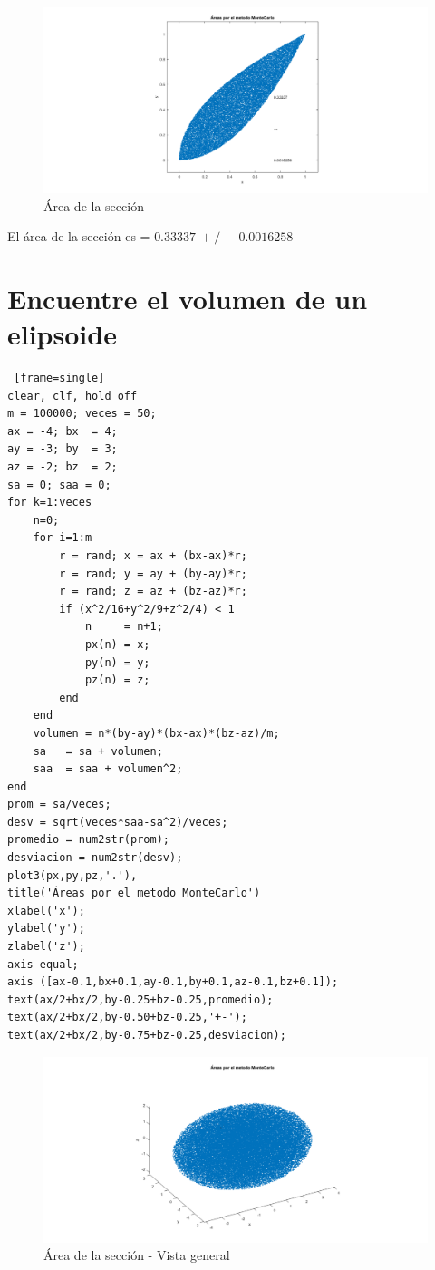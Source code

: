 \documentclass{article}
\begin{document}
\begin{figure}[H]
\centering
    \includegraphics[width=1\textwidth]{images/FIG04.png}
    \caption{Área de la sección}
\end{figure}
El área de la sección es = $0.33337~+/-~0.0016258$

\section{Encuentre el volumen de un elipsoide}

\begin{lstlisting} [frame=single]
clear, clf, hold off
m = 100000; veces = 50;
ax = -4; bx  = 4;
ay = -3; by  = 3;
az = -2; bz  = 2; 
sa = 0; saa = 0;
for k=1:veces
    n=0;
    for i=1:m
        r = rand; x = ax + (bx-ax)*r;
        r = rand; y = ay + (by-ay)*r;
        r = rand; z = az + (bz-az)*r;
        if (x^2/16+y^2/9+z^2/4) < 1
            n     = n+1;
            px(n) = x; 
            py(n) = y;
            pz(n) = z;
        end
    end
    volumen = n*(by-ay)*(bx-ax)*(bz-az)/m;
    sa   = sa + volumen;
    saa  = saa + volumen^2;
end
prom = sa/veces;
desv = sqrt(veces*saa-sa^2)/veces;
promedio = num2str(prom);
desviacion = num2str(desv);
plot3(px,py,pz,'.'),
title('Áreas por el metodo MonteCarlo') 
xlabel('x');
ylabel('y');
zlabel('z');
axis equal;
axis ([ax-0.1,bx+0.1,ay-0.1,by+0.1,az-0.1,bz+0.1]);
text(ax/2+bx/2,by-0.25+bz-0.25,promedio);
text(ax/2+bx/2,by-0.50+bz-0.25,'+-');
text(ax/2+bx/2,by-0.75+bz-0.25,desviacion);
\end{lstlisting}

\begin{figure}[H]
\centering
    \includegraphics[width=1\textwidth]{images/FIG05A.png}
    \caption{Área de la sección - Vista general}
\end{figure}
\end{document}
